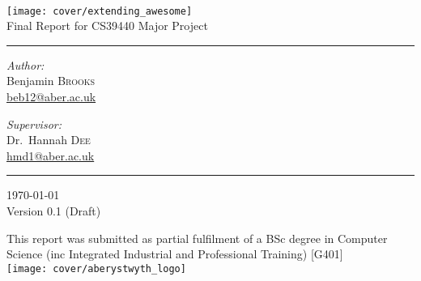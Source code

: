 \begin{titlepage}
	\begin{center}
	
	~\\
	
	\vspace{3cm}
	\texttt{[image: cover/extending\_awesome]} \\
	\vspace{0.5cm}
	{ \large Final Report for CS39440 Major Project }
	\vspace{2cm}

	\hrule
	\vspace{0.5cm}
	
	\noindent
	\begin{minipage}[t]{0.4\textwidth}
		\begin{flushleft} \large
			\emph{Author:}\\
			Benjamin \textsc{Brooks}\\
			\href{mailto:beb12@aber.ac.uk}{beb12@aber.ac.uk}
		\end{flushleft}
	\end{minipage}%
	\begin{minipage}[t]{0.4\textwidth}
		\begin{flushright} \large
			\emph{Supervisor:} \\
			Dr.~Hannah \textsc{Dee}\\
			\href{mailto:hmd1@aber.ac.uk}{hmd1@aber.ac.uk}
		\end{flushright}
	\end{minipage}
	
	\vspace{0.5cm}
	\hrule

	\vfill

	{\large \today \\ Version 0.1 (Draft)}
	
	\vspace{1cm}
	This report was submitted as partial fulfilment of a BSc degree in Computer Science (inc Integrated Industrial and Professional Training) [G401] \\
	\vspace{1cm}
	\texttt{[image: cover/aberystwyth\_logo]}
	
	\vspace{-2cm}

	\end{center}
\end{titlepage}
